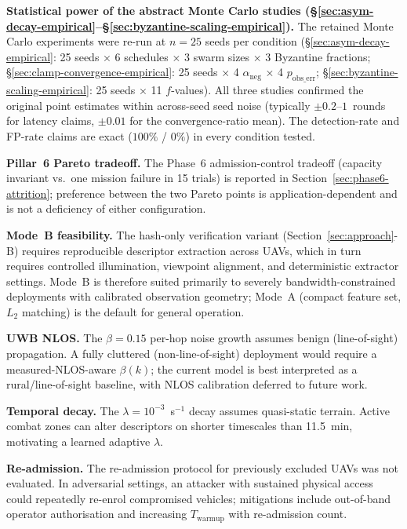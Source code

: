 \documentclass[journal,10pt,twocolumn]{IEEEtran}
\begin{document}
\textbf{Statistical power of the abstract Monte Carlo studies (\S\ref{sec:asym-decay-empirical}--\S\ref{sec:byzantine-scaling-empirical}).} The retained Monte Carlo experiments were re-run at $n{=}25$ seeds per condition (\S\ref{sec:asym-decay-empirical}: 25 seeds × 6 schedules × 3 swarm sizes × 3 Byzantine fractions; \S\ref{sec:clamp-convergence-empirical}: 25 seeds × 4 $\alpha_\text{neg}$ × 4 $p_\text{obs\_err}$; \S\ref{sec:byzantine-scaling-empirical}: 25 seeds × 11 $f$-values). All three studies confirmed the original point estimates within across-seed seed noise (typically $\pm 0.2$--$1$~rounds for latency claims, $\pm 0.01$ for the convergence-ratio mean). The detection-rate and FP-rate claims are exact ($100\%$ / $0\%$) in every condition tested.

\textbf{Pillar~6 Pareto tradeoff.} The Phase~6 admission-control tradeoff (capacity invariant vs.\ one mission failure in 15 trials) is reported in Section~\ref{sec:phase6-attrition}; preference between the two Pareto points is application-dependent and is not a deficiency of either configuration.

\textbf{Mode~B feasibility.} The hash-only verification variant (Section~\ref{sec:approach}-B) requires reproducible descriptor extraction across UAVs, which in turn requires controlled illumination, viewpoint alignment, and deterministic extractor settings. Mode~B is therefore suited primarily to severely bandwidth-constrained deployments with calibrated observation geometry; Mode~A (compact feature set, $L_2$ matching) is the default for general operation.

\textbf{UWB NLOS.} The $\beta{=}0.15$ per-hop noise growth assumes benign (line-of-sight) propagation. A fully cluttered (non-line-of-sight) deployment would require a measured-NLOS-aware $\beta(k)$; the current model is best interpreted as a rural/line-of-sight baseline, with NLOS calibration deferred to future work.

\textbf{Temporal decay.} The $\lambda = 10^{-3}$~s$^{-1}$ decay assumes quasi-static terrain. Active combat zones can alter descriptors on shorter timescales than 11.5~min, motivating a learned adaptive $\lambda$.

\textbf{Re-admission.} The re-admission protocol for previously excluded UAVs was not evaluated. In adversarial settings, an attacker with sustained physical access could repeatedly re-enrol compromised vehicles; mitigations include out-of-band operator authorisation and increasing $T_\text{warmup}$ with re-admission count.
\end{document}
